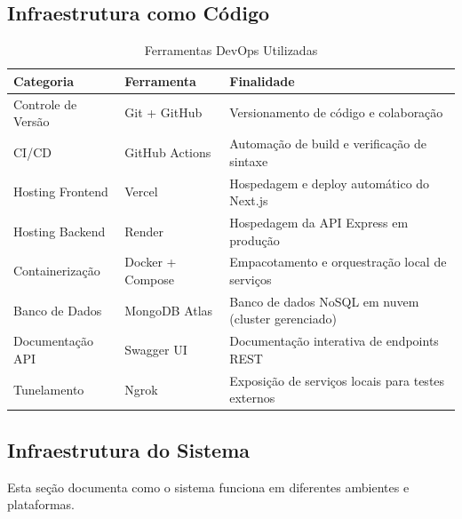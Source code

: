 \documentclass[11pt,a4paper]{article}
\begin{document}
\subsection{Infraestrutura como Código}
\begin{table}[H]
\centering
\caption{Ferramentas DevOps Utilizadas}
\label{tab:devops-tools}
\begin{tabular}{|l|l|p{6cm}|}
\hline
\textbf{Categoria} & \textbf{Ferramenta} & \textbf{Finalidade} \\
\hline
Controle de Versão & Git + GitHub & Versionamento de código e colaboração \\
CI/CD & GitHub Actions & Automação de build e verificação de sintaxe \\
Hosting Frontend & Vercel & Hospedagem e deploy automático do Next.js \\
Hosting Backend & Render & Hospedagem da API Express em produção \\
Containerização & Docker + Compose & Empacotamento e orquestração local de serviços \\
Banco de Dados & MongoDB Atlas & Banco de dados NoSQL em nuvem (cluster gerenciado) \\
Documentação API & Swagger UI & Documentação interativa de endpoints REST \\
Tunelamento & Ngrok & Exposição de serviços locais para testes externos \\
\hline
\end{tabular}
\end{table}


\subsection{Infraestrutura do Sistema}
Esta seção documenta como o sistema funciona em diferentes ambientes e plataformas.
\end{document}
